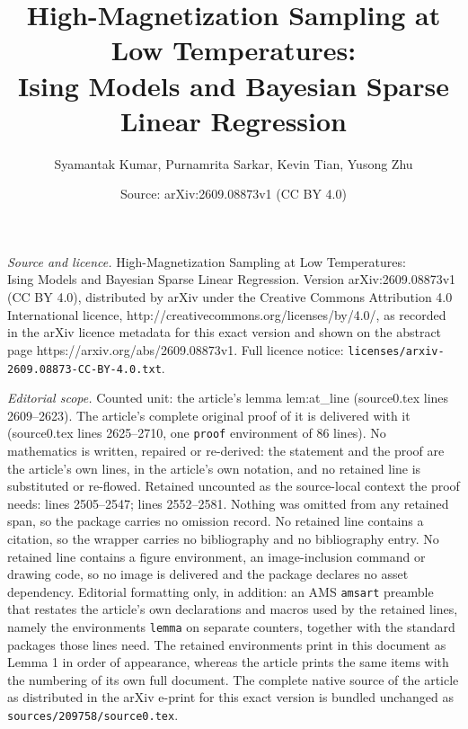 \documentclass[10pt,a4paper]{amsart}
\title{High-Magnetization Sampling at Low Temperatures: \\ Ising Models and Bayesian Sparse Linear Regression}
\author{Syamantak Kumar, Purnamrita Sarkar, Kevin Tian, Yusong Zhu}
\date{Source: arXiv:2609.08873v1 (CC BY 4.0)}
\begin{document}
\maketitle

\noindent\emph{Source and licence.} High-Magnetization Sampling at Low Temperatures: \\ Ising Models and Bayesian Sparse Linear Regression. Version arXiv:2609.08873v1 (CC BY 4.0), distributed by arXiv under the Creative Commons Attribution 4.0 International licence, http://creativecommons.org/licenses/by/4.0/, as recorded in the arXiv licence metadata for this exact version and shown on the abstract page https://arxiv.org/abs/2609.08873v1. Full licence notice: \texttt{licenses/arxiv-2609.08873-CC-BY-4.0.txt}.\par\smallskip

\noindent\textit{Editorial scope.} Counted unit: the article's lemma lem:at\_line (source0.tex lines 2609--2623). The article's complete original proof of it is delivered with it (source0.tex lines 2625--2710, one \texttt{proof} environment of 86 lines). No mathematics is written, repaired or re-derived: the statement and the proof are the article's own lines, in the article's own notation, and no retained line is substituted or re-flowed.  Retained uncounted as the source-local context the proof needs: lines 2505--2547; lines 2552--2581.  Nothing was omitted from any retained span, so the package carries no omission record.  No retained line contains a citation, so the wrapper carries no bibliography and no bibliography entry.  No retained line contains a figure environment, an image-inclusion command or drawing code, so no image is delivered and the package declares no asset dependency.  Editorial formatting only, in addition: an AMS \texttt{amsart} preamble that restates the article's own declarations and macros used by the retained lines, namely the environments \texttt{lemma} on separate counters, together with the standard packages those lines need.  The retained environments print in this document as Lemma 1 in order of appearance, whereas the article prints the same items with the numbering of its own full document.  The complete native source of the article as distributed in the arXiv e-print for this exact version is bundled unchanged as \texttt{sources/209758/source0.tex}.
\end{document}
